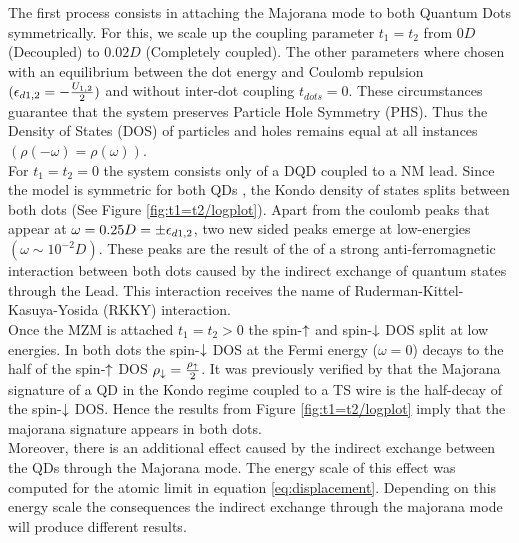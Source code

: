 \documentclass[showpacs,aps,prb,reprint,superscriptaddress]{revtex4-1}
\begin{document}
    
The first process consists in attaching the Majorana mode to both Quantum Dots symmetrically. For this, we scale up the coupling parameter $t_1=t_2$ from $0D$ (Decoupled) to $0.02D$ (Completely coupled). The other parameters where chosen with an equilibrium between the dot energy and Coulomb repulsion $(\epsilon_{d1,2}=-\frac{U_{1,2}}{2})$  and  without inter-dot coupling $t_{dots}=0$. These circumstances guarantee that the system preserves Particle Hole Symmetry (PHS). Thus the Density of States (DOS) of particles and holes remains equal at all instances $(\rho(-\omega) = \rho(\omega))$. \\
    
For $t_1 =t_2 = 0$ the system consists only of a DQD coupled to a NM lead. Since the model is symmetric for both QDs , the Kondo density of states  splits between both dots (See Figure \ref{fig:t1=t2/logplot}). Apart from the coulomb peaks that appear at $\omega=0.25D=\pm \epsilon_{d1,2}$, two new sided peaks emerge at low-energies $(\omega \sim 10^{-2}D)$. These peaks are the result of the of a strong anti-ferromagnetic interaction between both dots caused by the indirect exchange of quantum states through the Lead. This interaction receives the name of Ruderman-Kittel-Kasuya-Yosida (RKKY) interaction\cite{ruderman_indirect_1954,kasuya_theory_1956,yosida_magnetic_1957}. \\
    
    

Once the MZM is attached $t_1 =t_2 > 0$ the spin-$\uparrow$ and spin-$\downarrow$ DOS split at low energies. In both dots the spin-$\downarrow$ DOS at the Fermi energy ($\omega =0$) decays to the half of the spin-$\uparrow$ DOS $\rho_\downarrow = \frac{\rho_\uparrow}{2} $. It was previously verified  by  \citeauthor{ruiz-tijerina_interaction_2015} that the Majorana signature of a QD in the Kondo regime coupled to a TS wire is the half-decay of the spin-$\downarrow$ DOS. Hence the results from Figure \ref{fig:t1=t2/logplot} imply that the majorana signature appears in both dots. \\
    
Moreover, there is an additional effect caused by the indirect exchange between the QDs through the Majorana mode. The energy scale of this effect was computed for the atomic limit in equation \eqref{eq:displacement}. Depending on this energy scale the consequences the indirect exchange through the majorana mode will produce different results.

    
\end{document}
